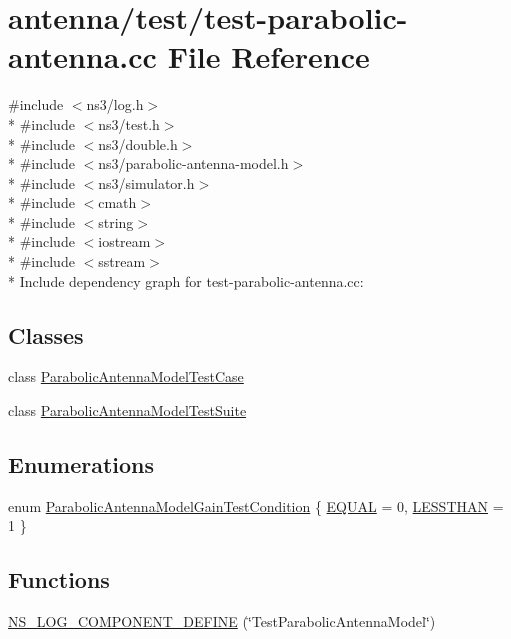 \hypertarget{test-parabolic-antenna_8cc}{}\section{antenna/test/test-\/parabolic-\/antenna.cc File Reference}
\label{test-parabolic-antenna_8cc}
{\ttfamily \#include $<$ns3/log.\+h$>$}\\*
{\ttfamily \#include $<$ns3/test.\+h$>$}\\*
{\ttfamily \#include $<$ns3/double.\+h$>$}\\*
{\ttfamily \#include $<$ns3/parabolic-\/antenna-\/model.\+h$>$}\\*
{\ttfamily \#include $<$ns3/simulator.\+h$>$}\\*
{\ttfamily \#include $<$cmath$>$}\\*
{\ttfamily \#include $<$string$>$}\\*
{\ttfamily \#include $<$iostream$>$}\\*
{\ttfamily \#include $<$sstream$>$}\\*
Include dependency graph for test-\/parabolic-\/antenna.cc\+:
\subsection*{Classes}
\begin{DoxyCompactItemize}
\item 
class \hyperlink{classParabolicAntennaModelTestCase}{Parabolic\+Antenna\+Model\+Test\+Case}
\item 
class \hyperlink{classParabolicAntennaModelTestSuite}{Parabolic\+Antenna\+Model\+Test\+Suite}
\end{DoxyCompactItemize}
\subsection*{Enumerations}
\begin{DoxyCompactItemize}
\item 
enum \hyperlink{test-parabolic-antenna_8cc_a893d085fdc93f5aae203e0153fb83d32}{Parabolic\+Antenna\+Model\+Gain\+Test\+Condition} \{ \hyperlink{test-parabolic-antenna_8cc_a893d085fdc93f5aae203e0153fb83d32a59a84258a4cb9025b567ee5139455029}{E\+Q\+U\+AL} = 0, 
\hyperlink{test-parabolic-antenna_8cc_a893d085fdc93f5aae203e0153fb83d32a8ce9b27601f653ddc597894a1018c55d}{L\+E\+S\+S\+T\+H\+AN} = 1
 \}
\end{DoxyCompactItemize}
\subsection*{Functions}
\begin{DoxyCompactItemize}
\item 
\hyperlink{test-parabolic-antenna_8cc_abb8cdf5ef1469553d5207251e1737ad0}{N\+S\+\_\+\+L\+O\+G\+\_\+\+C\+O\+M\+P\+O\+N\+E\+N\+T\+\_\+\+D\+E\+F\+I\+NE} (\char`\"{}Test\+Parabolic\+Antenna\+Model\char`\"{})
\end{DoxyCompactItemize}
